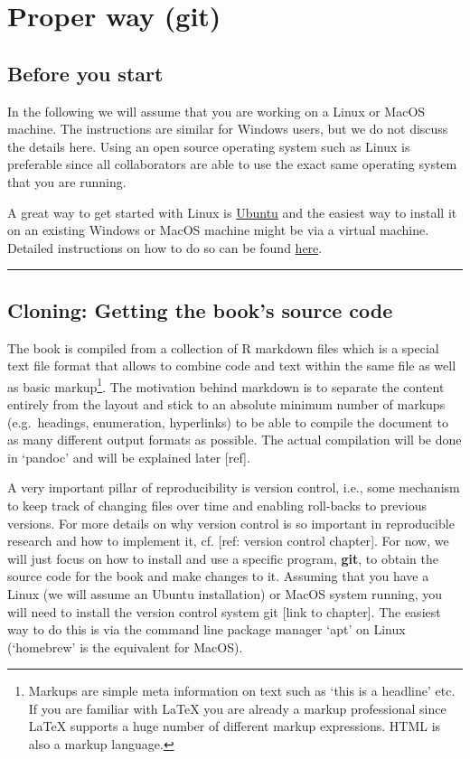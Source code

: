 \documentclass[]{book}
\let\rmarkdownfootnote\footnote%
\def\footnote{\protect\rmarkdownfootnote}
\begin{document}
\section{Proper way (git)}\label{proper-way-git}

\subsection{Before you start}\label{before-you-start}

In the following we will assume that you are working on a Linux or MacOS
machine. The instructions are similar for Windows users, but we do not
discuss the details here. Using an open source operating system such as
Linux is preferable since all collaborators are able to use the exact
same operating system that you are running.

A great way to get started with Linux is
\href{https://www.ubuntu.com/download/desktop}{Ubuntu} and the easiest
way to install it on an existing Windows or MacOS machine might be via a
virtual machine. Detailed instructions on how to do so can be found
\href{https://www.wikihow.com/Install-Ubuntu-on-VirtualBox}{here}.

\begin{center}\rule{0.5\linewidth}{\linethickness}\end{center}

\subsection{Cloning: Getting the book's source
code}\label{cloning-getting-the-books-source-code}

The book is compiled from a collection of R markdown files which is a
special text file format that allows to combine code and text within the
same file as well as basic markup\footnote{Markups are simple meta
  information on text such as `this is a headline' etc. If you are
  familiar with LaTeX you are already a markup professional since LaTeX
  supports a huge number of different markup expressions. HTML is also a
  markup language.}. The motivation behind markdown is to separate the
content entirely from the layout and stick to an absolute minimum number
of markups (e.g.~headings, enumeration, hyperlinks) to be able to
compile the document to as many different output formats as possible.
The actual compilation will be done in `pandoc' and will be explained
later {[}ref{]}.

A very important pillar of reproducibility is version control, i.e.,
some mechanism to keep track of changing files over time and enabling
roll-backs to previous versions. For more details on why version control
is so important in reproducible research and how to implement it, cf.
{[}ref: version control chapter{]}. For now, we will just focus on how
to install and use a specific program, \textbf{git}, to obtain the
source code for the book and make changes to it. Assuming that you have
a Linux (we will assume an Ubuntu installation) or MacOS system running,
you will need to install the version control system git {[}link to
chapter{]}. The easiest way to do this is via the command line package
manager `apt' on Linux (`homebrew' is the equivalent for MacOS).
\end{document}
